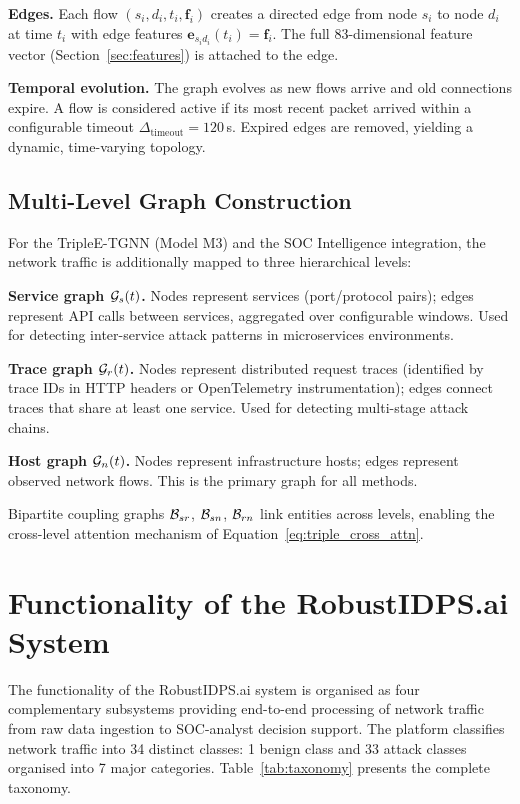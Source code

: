 \noindent\textbf{Edges.} Each flow $(s_i, d_i, t_i, \mathbf{f}_i)$ creates a directed edge from node $s_i$ to node $d_i$ at time $t_i$ with edge features $\mathbf{e}_{s_id_i}(t_i) = \mathbf{f}_i$. The full 83-dimensional feature vector (Section~\ref{sec:features}) is attached to the edge.

\noindent\textbf{Temporal evolution.} The graph evolves as new flows arrive and old connections expire. A flow is considered active if its most recent packet arrived within a configurable timeout $\Delta_{\mathrm{timeout}}=120$\,s. Expired edges are removed, yielding a dynamic, time-varying topology.

\subsection{Multi-Level Graph Construction}

For the TripleE-TGNN (Model M3) and the SOC Intelligence integration, the network traffic is additionally mapped to three hierarchical levels:

\noindent\textbf{Service graph $\mathcal{G}_s(t)$.} Nodes represent services (port/protocol pairs); edges represent API calls between services, aggregated over configurable windows. Used for detecting inter-service attack patterns in microservices environments.

\noindent\textbf{Trace graph $\mathcal{G}_r(t)$.} Nodes represent distributed request traces (identified by trace IDs in HTTP headers or OpenTelemetry instrumentation); edges connect traces that share at least one service. Used for detecting multi-stage attack chains.

\noindent\textbf{Host graph $\mathcal{G}_n(t)$.} Nodes represent infrastructure hosts; edges represent observed network flows. This is the primary graph for all methods.

\noindent Bipartite coupling graphs $\mathcal{B}_{sr}$, $\mathcal{B}_{sn}$, $\mathcal{B}_{rn}$ link entities across levels, enabling the cross-level attention mechanism of Equation~\eqref{eq:triple_cross_attn}.

\section{Functionality of the RobustIDPS.ai System}
\label{sec:taxonomy}

The functionality of the RobustIDPS.ai system is organised as four complementary subsystems providing end-to-end processing of network traffic from raw data ingestion to SOC-analyst decision support. The platform classifies network traffic into 34 distinct classes: 1 benign class and 33 attack classes organised into 7 major categories. Table~\ref{tab:taxonomy} presents the complete taxonomy.

